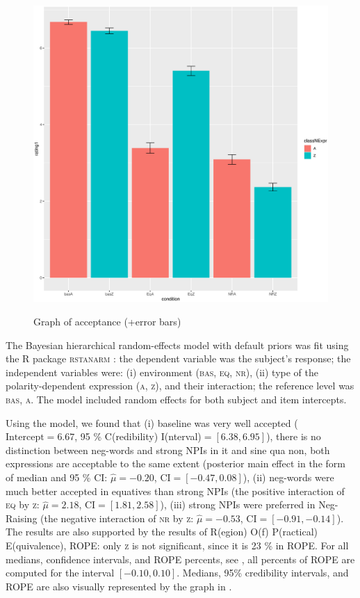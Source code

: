 \begin{figure}
  \centering
  \caption{Graph of acceptance (+error bars)}
  \includegraphics[scale=0.4]{error_bar_without_prob.eps}
  \label{fig-error-bar}
\end{figure}

The Bayesian hierarchical random-effects model with default priors was fit using the R package \textsc{rstanarm} \citep{rstanarm}: the dependent variable was the subject's response; the independent variables were: (i) environment (\textsc{bas, eq, nr}), (ii) type of the polarity-dependent expression (\textsc{a, z}), and their interaction; the reference level was \textsc{bas, a}. The model included random effects for both subject and item intercepts.

Using the model, we found that (i) baseline was very well accepted ($\mathrm{Intercept}=6.67$, 95 \% C(redibility) I(nterval)$=[6.38, 6.95]$), there is no distinction between neg-words and strong NPIs in it and sine qua non, both expressions are acceptable to the same extent (posterior main effect in the form of median and 95 \% CI: $\hat{\mu}=-0.20$, $\mathrm{CI}=[-0.47, 0.08]$), (ii) neg-words were much better accepted in equatives than strong NPIs (the positive interaction of \textsc{eq} by \textsc{z}: $\hat{\mu}=2.18$, $\mathrm{CI}=[1.81, 2.58]$), (iii) strong NPIs were preferred in Neg-Raising (the negative interaction of \textsc{nr} by \textsc{z}: $\hat{\mu}=-0.53$, $\mathrm{CI}=[-0.91, -0.14]$). The results are also supported by the results of R(egion) O(f) P(ractical) E(quivalence), ROPE: only \textsc{z} is not significant, since it is 23 \% in ROPE. For all medians, confidence intervals, and ROPE percents, see , all percents of ROPE are computed for the interval $[-0.10, 0.10]$. Medians, 95\% credibility intervals, and ROPE are also visually represented by the graph in .



